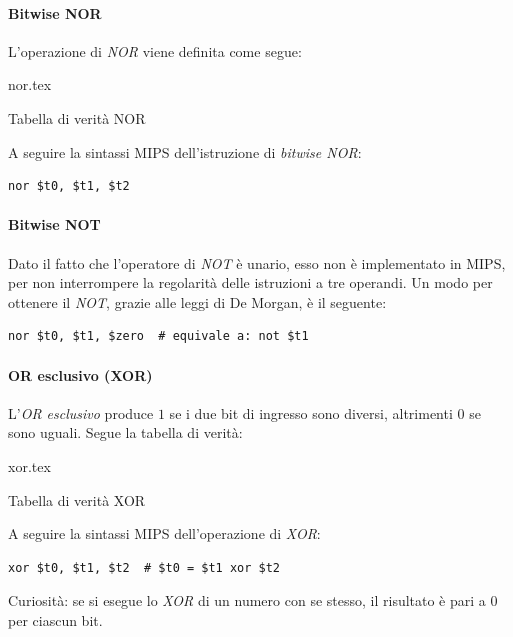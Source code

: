 \documentclass[class=book, crop=false]{standalone}
\begin{document}
\paragraph{Bitwise NOR}
L'operazione di \emph{NOR} viene definita come segue:
\begin{table}[H]
	\centering
	{nor.tex}
	\caption{Tabella di verità NOR}
\end{table}

A seguire la sintassi MIPS dell'istruzione di \emph{bitwise NOR}:
\begin{verbatim}
nor $t0, $t1, $t2
\end{verbatim}

\paragraph{Bitwise NOT}
Dato il fatto che l'operatore di \emph{NOT} è unario, esso non è implementato in MIPS, per non interrompere la regolarità delle istruzioni a tre operandi. Un modo per ottenere il \emph{NOT}, grazie alle leggi di De Morgan, è il seguente:
\begin{verbatim}
nor $t0, $t1, $zero  # equivale a: not $t1
\end{verbatim}

\paragraph{OR esclusivo (XOR)}
L'\emph{OR esclusivo} produce \(1\) se i due bit di ingresso sono diversi, altrimenti \(0\) se sono uguali. Segue la tabella di verità:
\begin{table}[H]
	\centering
	{xor.tex}
	\caption{Tabella di verità XOR}
\end{table}

A seguire la sintassi MIPS dell'operazione di \emph{XOR}:
\begin{verbatim}
xor $t0, $t1, $t2  # $t0 = $t1 xor $t2
\end{verbatim}

Curiosità: se si esegue lo \emph{XOR} di un numero con se stesso, il risultato è pari a \(0\) per ciascun bit.
\end{document}
